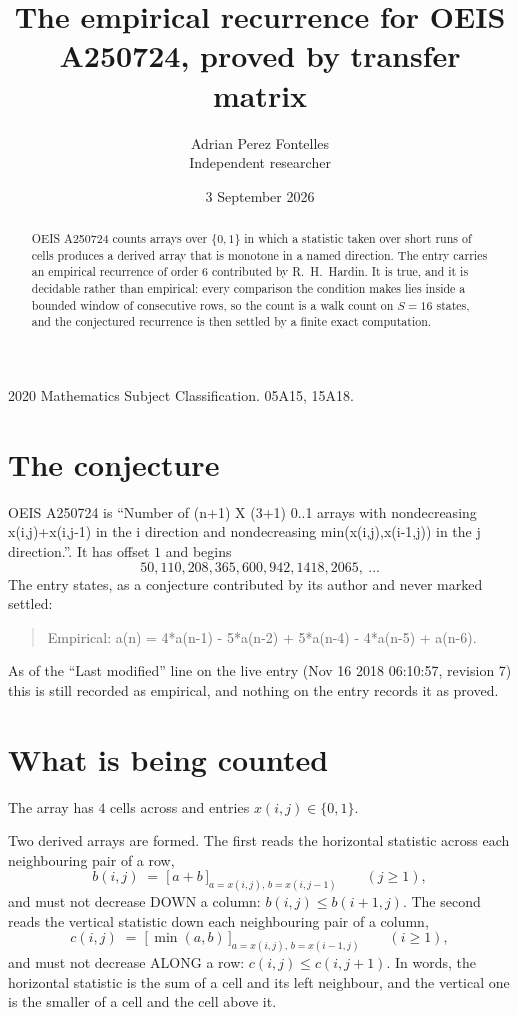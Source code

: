 \documentclass[11pt,a4paper]{article}
\title{The empirical recurrence for OEIS A250724, proved by transfer matrix}
\author{Adrian Perez Fontelles\\ \small Independent researcher}
\date{3 September 2026}
\theoremstyle{plain}
\theoremstyle{definition}
\begin{document}
\maketitle

\begin{abstract}
OEIS A250724 counts arrays over $\{0,1\}$ in which a statistic taken over short runs
of cells produces a derived array that is monotone in a named direction. The entry carries an
empirical recurrence of order $6$ contributed by R.~H.~Hardin. It is true, and it is
decidable rather than empirical: every comparison the condition makes lies inside a bounded
window of consecutive rows, so the count is a walk count on $S=16$ states, and the
conjectured recurrence is then settled by a finite exact computation.
\end{abstract}

\noindent\small 2020 Mathematics Subject Classification. 05A15, 15A18.\normalsize

\section{The conjecture}

OEIS A250724 is ``Number of (n+1) X (3+1) 0..1 arrays with nondecreasing x(i,j)+x(i,j-1) in the i direction and nondecreasing min(x(i,j),x(i-1,j)) in the j direction.''. It has offset $1$ and begins
\[
50, 110, 208, 365, 600, 942, 1418, 2065,\ \dots
\]
The entry states, as a conjecture contributed by its author and never marked settled:
\begin{quote}
Empirical: a(n) = 4*a(n-1) - 5*a(n-2) + 5*a(n-4) - 4*a(n-5) + a(n-6).
\end{quote}
As of the ``Last modified'' line on the live entry (Nov 16 2018 06:10:57, revision 7) this is still
recorded as empirical, and nothing on the entry records it as proved.

\section{What is being counted}

The array has $4$ cells across and entries $x(i,j)\in\{0,1\}$.

Two derived arrays are formed. The first reads the horizontal statistic across each
neighbouring pair of a row,
\[
b(i,j)\;=\;\bigl[\,a+b\,\bigr]_{a=x(i,j),\,b=x(i,j-1)}\qquad (j\ge1),
\]
and must not decrease DOWN a column: $b(i,j)\le b(i{+}1,j)$. The second reads the vertical
statistic down each neighbouring pair of a column,
\[
c(i,j)\;=\;\bigl[\,\min(a,b)\,\bigr]_{a=x(i,j),\,b=x(i{-}1,j)}\qquad (i\ge1),
\]
and must not decrease ALONG a row: $c(i,j)\le c(i,j{+}1)$. In words, the horizontal statistic
is the sum of a cell and its left neighbour, and the vertical one is
the smaller of a cell and the cell above it.
\end{document}
